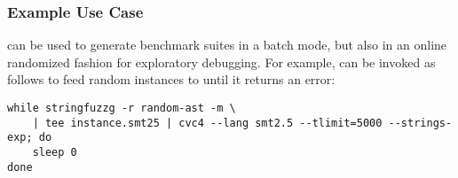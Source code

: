 \subsubsection{Example Use Case}

\fuzzer{} can be used to generate benchmark suites in a batch mode, but also
in an online randomized fashion for exploratory debugging. For example,
\fuzzer{} can be invoked as follows to feed random instances to \cvc{} until it
returns an error:
{\scriptsize\begin{verbatim}
while stringfuzzg -r random-ast -m \
    | tee instance.smt25 | cvc4 --lang smt2.5 --tlimit=5000 --strings-exp; do
    sleep 0
done\end{verbatim}}
